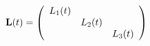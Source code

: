 \vspace{-0.1cm}
\begin{equation}
    \mathbf{L}(t) = \left(
    \begin{array}{ccc}
    L_1(t) && \\
    & L_2(t) &\\
    && L_3(t)
    \end{array}
    \right)
    \label{eq:uxo-L}
    \vspace{-0.05cm}
\end{equation}
